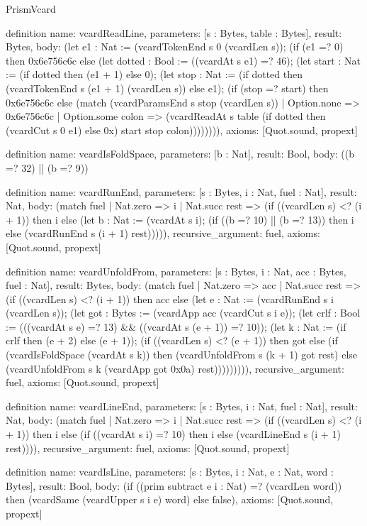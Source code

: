 \begin{lexlean}{PrismVcard}
\begin{semanticmodule}
definition{
  name: vcardReadLine,
  parameters: [s : Bytes, table : Bytes],
  result: Bytes,
  body: (let e1 : Nat := (vcardTokenEnd s 0 (vcardLen s)); (if (e1 =? 0) then 0x6e756c6c else (let dotted : Bool := ((vcardAt s e1) =? 46); (let start : Nat := (if dotted then (e1 + 1) else 0); (let stop : Nat := (if dotted then (vcardTokenEnd s (e1 + 1) (vcardLen s)) else e1); (if (stop =? start) then 0x6e756c6c else (match (vcardParamsEnd s stop (vcardLen s))
    | Option.none => 0x6e756c6c
    | Option.some colon => (vcardReadAt s table (if dotted then (vcardCut s 0 e1) else 0x) start stop colon)))))))),
  axioms: [Quot.sound, propext]
}

definition{
  name: vcardIsFoldSpace,
  parameters: [b : Nat],
  result: Bool,
  body: ((b =? 32) || (b =? 9))
}

definition{
  name: vcardRunEnd,
  parameters: [s : Bytes, i : Nat, fuel : Nat],
  result: Nat,
  body: (match fuel
    | Nat.zero => i
    | Nat.succ rest => (if ((vcardLen s) <? (i + 1)) then i else (let b : Nat := (vcardAt s i); (if ((b =? 10) || (b =? 13)) then i else (vcardRunEnd s (i + 1) rest))))),
  recursive_argument: fuel,
  axioms: [Quot.sound, propext]
}

definition{
  name: vcardUnfoldFrom,
  parameters: [s : Bytes, i : Nat, acc : Bytes, fuel : Nat],
  result: Bytes,
  body: (match fuel
    | Nat.zero => acc
    | Nat.succ rest => (if ((vcardLen s) <? (i + 1)) then acc else (let e : Nat := (vcardRunEnd s i (vcardLen s)); (let got : Bytes := (vcardApp acc (vcardCut s i e)); (let crlf : Bool := (((vcardAt s e) =? 13) && ((vcardAt s (e + 1)) =? 10)); (let k : Nat := (if crlf then (e + 2) else (e + 1)); (if ((vcardLen s) <? (e + 1)) then got else (if (vcardIsFoldSpace (vcardAt s k)) then (vcardUnfoldFrom s (k + 1) got rest) else (vcardUnfoldFrom s k (vcardApp got 0x0a) rest))))))))),
  recursive_argument: fuel,
  axioms: [Quot.sound, propext]
}

definition{
  name: vcardLineEnd,
  parameters: [s : Bytes, i : Nat, fuel : Nat],
  result: Nat,
  body: (match fuel
    | Nat.zero => i
    | Nat.succ rest => (if ((vcardLen s) <? (i + 1)) then i else (if ((vcardAt s i) =? 10) then i else (vcardLineEnd s (i + 1) rest)))),
  recursive_argument: fuel,
  axioms: [Quot.sound, propext]
}

definition{
  name: vcardIsLine,
  parameters: [s : Bytes, i : Nat, e : Nat, word : Bytes],
  result: Bool,
  body: (if ((prim subtract e i : Nat) =? (vcardLen word)) then (vcardSame (vcardUpper s i e) word) else false),
  axioms: [Quot.sound, propext]
}


\end{semanticmodule}
\end{lexlean}
